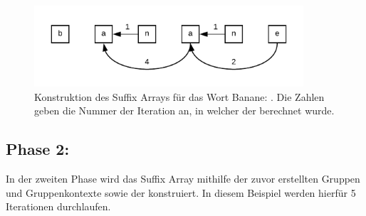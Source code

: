 

\newpage 		%



\begin{figure}[!b]
	\begin{minipage}[H]{10cm}
		\centering
		\includegraphics[width=10cm]{kapitel/saca_algorithmen/gsaca/images/Banane-prev-pointer}
	\end{minipage}
	\caption[Konstruktion des Suffix Arrays für das Wort Banane: \prevpointer]{Konstruktion des Suffix Arrays für das Wort Banane: \prevpointer. Die Zahlen geben die Nummer der Iteration an, in welcher der \prevpointer berechnet wurde.}
\label{fig_banane_prev_pointer}
\end{figure}
\newpage		%
\newpage		%
\newpage		%

\subsection*{Phase 2:}
In der zweiten Phase wird das Suffix Array mithilfe der zuvor erstellten Gruppen und Gruppenkontexte sowie der \prevpointer konstruiert. 
In diesem Beispiel werden hierfür 5 Iterationen durchlaufen.\\

